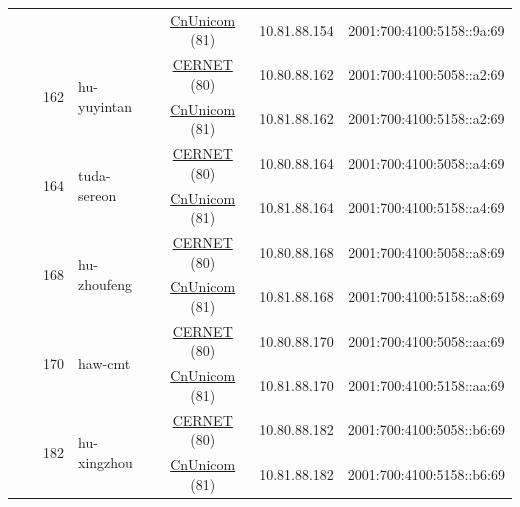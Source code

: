 \begin{small}
\begin{center}
\begin{longtable}{|c|c|c|c|c|c|c|c|}
  &  &  &  & \multicolumn{2}{|c|}{\tiny{\href{http://www.chinaunicom.com}{CnUnicom} (81)}} & \tiny{10.81.88.154} & \tiny{2001:700:4100:5158::9a:69} \\* \cline{3-3}\cline{4-4}\cline{5-5}\cline{6-6}\cline{7-7}\cline{8-8}
  &  & \multirow{2}{*}{\tiny{162}} & \multicolumn{1}{|l|}{\multirow{2}{*}{\tiny{hu-yuyintan}}} & \multicolumn{2}{|c|}{\tiny{\href{http://www.cernet.edu.cn}{CERNET} (80)}} & \tiny{10.80.88.162} & \tiny{2001:700:4100:5058::a2:69} \\* \cline{5-5}\cline{6-6}\cline{7-7}\cline{8-8}
  &  &  &  & \multicolumn{2}{|c|}{\tiny{\href{http://www.chinaunicom.com}{CnUnicom} (81)}} & \tiny{10.81.88.162} & \tiny{2001:700:4100:5158::a2:69} \\* \cline{3-3}\cline{4-4}\cline{5-5}\cline{6-6}\cline{7-7}\cline{8-8}
  &  & \multirow{2}{*}{\tiny{164}} & \multicolumn{1}{|l|}{\multirow{2}{*}{\tiny{tuda-sereon}}} & \multicolumn{2}{|c|}{\tiny{\href{http://www.cernet.edu.cn}{CERNET} (80)}} & \tiny{10.80.88.164} & \tiny{2001:700:4100:5058::a4:69} \\* \cline{5-5}\cline{6-6}\cline{7-7}\cline{8-8}
  &  &  &  & \multicolumn{2}{|c|}{\tiny{\href{http://www.chinaunicom.com}{CnUnicom} (81)}} & \tiny{10.81.88.164} & \tiny{2001:700:4100:5158::a4:69} \\* \cline{3-3}\cline{4-4}\cline{5-5}\cline{6-6}\cline{7-7}\cline{8-8}
  &  & \multirow{2}{*}{\tiny{168}} & \multicolumn{1}{|l|}{\multirow{2}{*}{\tiny{hu-zhoufeng}}} & \multicolumn{2}{|c|}{\tiny{\href{http://www.cernet.edu.cn}{CERNET} (80)}} & \tiny{10.80.88.168} & \tiny{2001:700:4100:5058::a8:69} \\* \cline{5-5}\cline{6-6}\cline{7-7}\cline{8-8}
  &  &  &  & \multicolumn{2}{|c|}{\tiny{\href{http://www.chinaunicom.com}{CnUnicom} (81)}} & \tiny{10.81.88.168} & \tiny{2001:700:4100:5158::a8:69} \\* \cline{3-3}\cline{4-4}\cline{5-5}\cline{6-6}\cline{7-7}\cline{8-8}
  &  & \multirow{2}{*}{\tiny{170}} & \multicolumn{1}{|l|}{\multirow{2}{*}{\tiny{haw-cmt}}} & \multicolumn{2}{|c|}{\tiny{\href{http://www.cernet.edu.cn}{CERNET} (80)}} & \tiny{10.80.88.170} & \tiny{2001:700:4100:5058::aa:69} \\* \cline{5-5}\cline{6-6}\cline{7-7}\cline{8-8}
  &  &  &  & \multicolumn{2}{|c|}{\tiny{\href{http://www.chinaunicom.com}{CnUnicom} (81)}} & \tiny{10.81.88.170} & \tiny{2001:700:4100:5158::aa:69} \\* \cline{3-3}\cline{4-4}\cline{5-5}\cline{6-6}\cline{7-7}\cline{8-8}
  &  & \multirow{2}{*}{\tiny{182}} & \multicolumn{1}{|l|}{\multirow{2}{*}{\tiny{hu-xingzhou}}} & \multicolumn{2}{|c|}{\tiny{\href{http://www.cernet.edu.cn}{CERNET} (80)}} & \tiny{10.80.88.182} & \tiny{2001:700:4100:5058::b6:69} \\* \cline{5-5}\cline{6-6}\cline{7-7}\cline{8-8}
  &  &  &  & \multicolumn{2}{|c|}{\tiny{\href{http://www.chinaunicom.com}{CnUnicom} (81)}} & \tiny{10.81.88.182} & \tiny{2001:700:4100:5158::b6:69} \\ \hline
\end{longtable}
\end{center}
\end{small}
